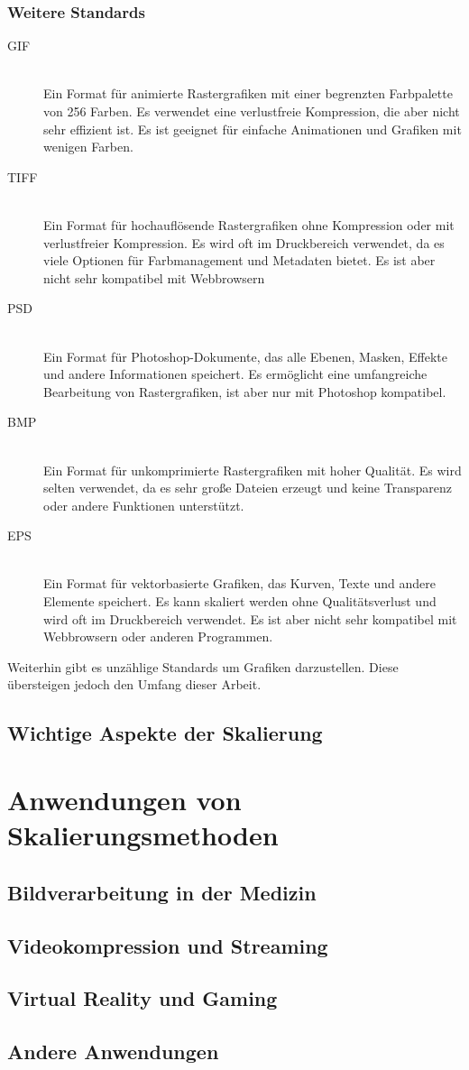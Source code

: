 \subsubsection{Weitere Standards}
\begin{description}
    \item[GIF] \\
    Ein Format für animierte Rastergrafiken mit einer begrenzten Farbpalette von 256 Farben. Es verwendet eine verlustfreie Kompression, die aber nicht sehr effizient ist. Es ist geeignet für einfache Animationen und Grafiken mit wenigen Farben.
    \item[TIFF] \\
    Ein Format für hochauflösende Rastergrafiken ohne Kompression oder mit verlustfreier Kompression. Es wird oft im Druckbereich verwendet, da es viele Optionen für Farbmanagement und Metadaten bietet. Es ist aber nicht sehr kompatibel mit Webbrowsern
    \item[PSD] \\
    Ein Format für Photoshop-Dokumente, das alle Ebenen, Masken, Effekte und andere Informationen speichert. Es ermöglicht eine umfangreiche Bearbeitung von Rastergrafiken, ist aber nur mit Photoshop kompatibel.
    \item[BMP] \\
    Ein Format für unkomprimierte Rastergrafiken mit hoher Qualität. Es wird selten verwendet, da es sehr große Dateien erzeugt und keine Transparenz oder andere Funktionen unterstützt.
    \item[EPS] \\
    Ein Format für vektorbasierte Grafiken, das Kurven, Texte und andere Elemente speichert. Es kann skaliert werden ohne Qualitätsverlust und wird oft im Druckbereich verwendet. Es ist aber nicht sehr kompatibel mit Webbrowsern oder anderen Programmen.
\end{description}
Weiterhin gibt es unzählige Standards um Grafiken darzustellen. Diese übersteigen jedoch den Umfang dieser Arbeit.
\subsection{Wichtige Aspekte der Skalierung}


\section{Anwendungen von Skalierungsmethoden}

\subsection{Bildverarbeitung in der Medizin}

\subsection{Videokompression und Streaming}

\subsection{Virtual Reality und Gaming}

\subsection{Andere Anwendungen}

